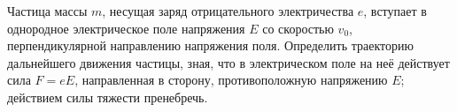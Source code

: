 Частица массы $m$, несущая заряд отрицательного электричества $e$, вступает в однородное электрическое поле напряжения $E$
со скоростью $v_{0}$, перпендикулярной направлению напряжения поля. Определить траекторию дальнейшего движения частицы,
зная, что в электрическом поле на неё действует сила $F=eE$, направленная в сторону, противоположную напряжению $E$;
действием силы тяжести пренебречь.
